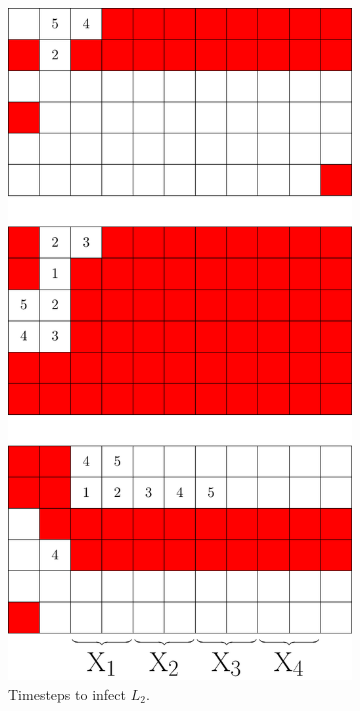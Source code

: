 \begin{figure}[]
\begin{subfigure}[t]{0.2915\textwidth}
\includegraphics[width=\textwidth]{figures/7/6x11x3_L2_numbered_heatmap.pdf}
\caption{Timesteps to infect $L_2$.}
\label{fig:6x11x3_timesteps}
\end{subfigure}
\caption{}
\label{fig:}
\end{figure} 

